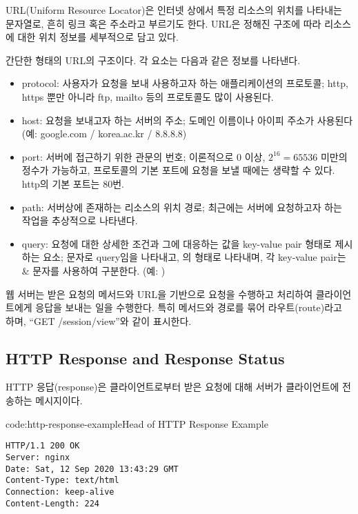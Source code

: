 URL(Uniform Resource Locator)은 인터넷 상에서 특정 리소스의 위치를 나타내는 문자열로, 흔히 링크 혹은 주소라고 부르기도 한다. URL은 정해진 구조에 따라 리소스에 대한 위치 정보를 세부적으로 담고 있다.

    {}

\는 간단한 형태의 URL의 구조이다. 각 요소는 다음과 같은 정보를 나타낸다.

\begin{itemize}
    \item protocol: 사용자가 요청을 보내 사용하고자 하는 애플리케이션의 프로토콜; http, https 뿐만 아니라 ftp, mailto 등의 프로토콜도 많이 사용된다.
    \item host: 요청을 보내고자 하는 서버의 주소; 도메인 이름이나 아이피 주소가 사용된다 (예: google.com / korea.ac.kr / 8.8.8.8)
    \item port: 서버에 접근하기 위한 관문의 번호; 이론적으로 0 이상, $2^{16}=65536$ 미만의 정수가 가능하고, 프로토콜의 기본 포트에 요청을 보낼 때에는 생략할 수 있다. http의 기본 포트는 80번.
    \item path: 서버상에 존재하는 리소스의 위치 경로; 최근에는 서버에 요청하고자 하는 작업을 추상적으로 나타낸다.
    \item query: 요청에 대한 상세한 조건과 그에 대응하는 값을 key-value pair 형태로 제시하는 요소;  문자로 query임을 나타내고, 의 형태로 나타내며, 각 key-value pair는 \cd\& 문자를 사용하여 구분한다. (예: )
\end{itemize}

웹 서버는 받은 요청의 메서드와 URL을 기반으로 요청을 수행하고 처리하여 클라이언트에게 응답을 보내는 일을 수행한다. 특히 메서드와 경로를 묶어 라우트(route)라고 하며, ``GET /session/view''와 같이 표시한다.

\subsection*{HTTP Response and Response Status}
HTTP 응답(response)은 클라이언트로부터 받은 요청에 대해 서버가 클라이언트에 전송하는 메시지이다.

\begin{codeenv}{code:http-response-example}{Head of HTTP Response Example}\begin{verbatim}
HTTP/1.1 200 OK
Server: nginx
Date: Sat, 12 Sep 2020 13:43:29 GMT
Content-Type: text/html
Connection: keep-alive
Content-Length: 224
\end{verbatim}
\end{codeenv}

